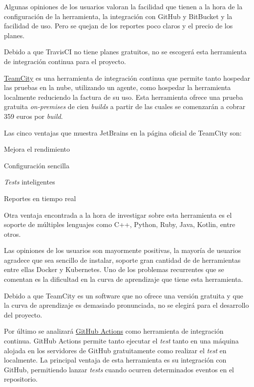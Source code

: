 Algunas opiniones de los usuarios valoran la facilidad que tienen a la hora de la configuración de la herramienta, la integración con GitHub y BitBucket y la facilidad de uso. Pero se quejan de los reportes poco claros y el precio de los planes. \cite{TravisCI2023}

Debido a que TravisCI no tiene planes gratuitos, no se escogerá esta herramienta de integración continua para el proyecto. 

\href{https://www.jetbrains.com/es-es/teamcity/}{TeamCity} es una herramienta de integración continua que permite tanto hospedar las pruebas en la nube, utilizando un agente, como hospedar la herramienta localmente reduciendo la factura de su uso. Esta herramienta ofrece una prueba gratuita \emph{on-premises} de cien \emph{builds} a partir de las cuales se comenzarán a cobrar 359 euros por \emph{build}.

Las cinco ventajas que muestra JetBrains en la página oficial de TeamCity son:
\begin{numerate}
    \item Mejora el rendimiento
    \item Configuración sencilla
    \item \emph{Tests} inteligentes
    \item Reportes en tiempo real
\end{numerate}

Otra ventaja encontrada a la hora de investigar sobre esta herramienta es el soporte de múltiples lenguajes como C++, Python, Ruby, Java, Kotlin, entre otros.

Las opiniones de los usuarios son mayormente positivas, la mayoría de usuarios agradece que sea sencillo de instalar, soporte gran cantidad de de herramientas entre ellas Docker y Kubernetes. Uno de los problemas recurrentes que se comentan es la dificultad en la curva de aprendizaje que tiene esta herramienta. \cite{TeamCity2023}

Debido a que TeamCity es un software que no ofrece una versión gratuita y que la curva de aprendizaje es demasiado pronunciada, no se elegirá para el desarrollo del proyecto. 

Por último se analizará \href{https://github.com/features/actions}{GitHub Actions} como herramienta de integración continua. GitHub Actions permite tanto ejecutar el \emph{test} tanto en una máquina alojada en los servidores de GitHub gratuitamente como realizar el \emph{test} en localmente. La principal ventaja de esta herramienta es su integración con GitHub, permitiendo lanzar \emph{tests} cuando ocurren determinados eventos en el repositorio.

